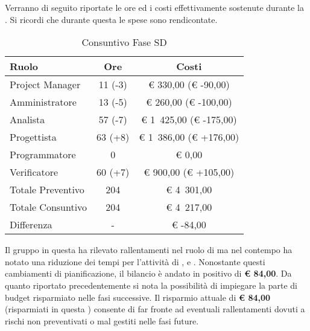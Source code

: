 	Verranno di seguito riportate le ore ed i costi effettivamente sostenute durante la . Si ricordi che durante questa  le spese sono rendicontate.
	\begin{table}[H]
		\begin{center}
			\begin{tabular}{| l | c | c |}
				\hline
				Ruolo 				& Ore 	& Costi  \\ \hline
				
				Project Manager		& 11 (-3) 		& \euro{} 330,00 (\euro{} -90,00)	\\
				Amministratore 		& 13 (-5)		& \euro{} 260,00 (\euro{} -100,00)	\\
				Analista	 		& 57 (-7)		& \euro{} 1~425,00 (\euro{} -175,00)	\\
				Progettista 		& 63 (+8)		& \euro{} 1~386,00  (\euro{} +176,00)	\\
				Programmatore		& 0				& \euro{} 0,00	\\
				Verificatore		& 60 (+7)		& \euro{} 900,00 (\euro{} +105,00)	\\ \hline \hline
					
				Totale Preventivo	& 204 			& \euro{} 4~301,00 	\\ \hline
				Totale Consuntivo	& 204 			& \euro{} 4~217,00 	\\ \hline
				Differenza			& - 			& \euro{} -84,00 	\\ \hline	
			\end{tabular}
		\end{center}
		\caption{Consuntivo Fase SD}
	\end{table}
			Il gruppo \groupname{} in questa  ha rilevato rallentamenti nel ruolo di  ma nel contempo ha notato una riduzione dei tempi per l'attività di ,  e . Nonostante questi cambiamenti di pianificazione, il bilancio è andato in positivo di \textbf{\euro{} 84,00}.
			Da quanto riportato precedentemente si nota la possibilità di impiegare la parte di budget risparmiato nelle fasi successive. Il risparmio attuale di \textbf{\euro{} 84,00} (risparmiati in questa ) consente di far fronte ad eventuali rallentamenti dovuti a rischi non preventivati o mal gestiti nelle fasi future.

